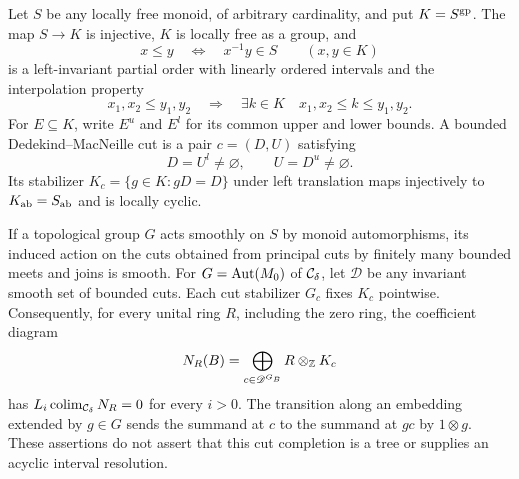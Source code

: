 \begin{proposition}
\label{G:cutstabilizers}
Let $S$ be any locally free monoid, of arbitrary cardinality, and
put $K=S^{\mathrm{gp}}$. The map $S\to K$ is injective, $K$ is locally
free as a group, and
\[
 x\le y\quad\Longleftrightarrow\quad x^{-1}y\in S
 \qquad(x,y\in K)
\]
is a left-invariant partial order with linearly ordered intervals
and the interpolation property
\[
 x_1,x_2\le y_1,y_2
 \quad\Longrightarrow\quad
 \exists k\in K\quad x_1,x_2\le k\le y_1,y_2.
\]
For $E\subseteq K$, write $E^u$ and $E^l$ for its common upper
and lower bounds. A bounded Dedekind--MacNeille cut is a pair
$c=(D,U)$ satisfying
\[
 D=U^l\ne\varnothing,\qquad U=D^u\ne\varnothing.
\]
Its stabilizer $K_c=\{g\in K:gD=D\}$ under left translation
maps injectively to $K_{\mathrm{ab}}=S_{\mathrm{ab}}$ and is locally cyclic.

If a topological group $G$ acts smoothly on $S$ by monoid
automorphisms, its induced action on the cuts obtained from
principal cuts by finitely many bounded meets and joins is
smooth. For $G=\operatorname{Aut}(M_0)$ of $\mathcal C_\delta$, let $\mathscr D$ be
any invariant smooth set of bounded cuts. Each cut stabilizer
$G_c$ fixes $K_c$ pointwise. Consequently, for every unital ring
$R$, including the zero ring, the coefficient diagram
\[
 N_R(B)=\bigoplus_{c\in\mathscr D^{G_B}}
            R\otimes_{\mathbb Z}K_c
\]
has $L_i\operatorname*{colim}_{\mathcal C_\delta}N_R=0$ for every $i>0$.
The transition along an embedding extended by $g\in G$ sends
the summand at $c$ to the summand at $gc$ by $1\otimes g$.
These assertions do not assert that this cut completion is a
tree or supplies an acyclic interval resolution.
\end{proposition}
